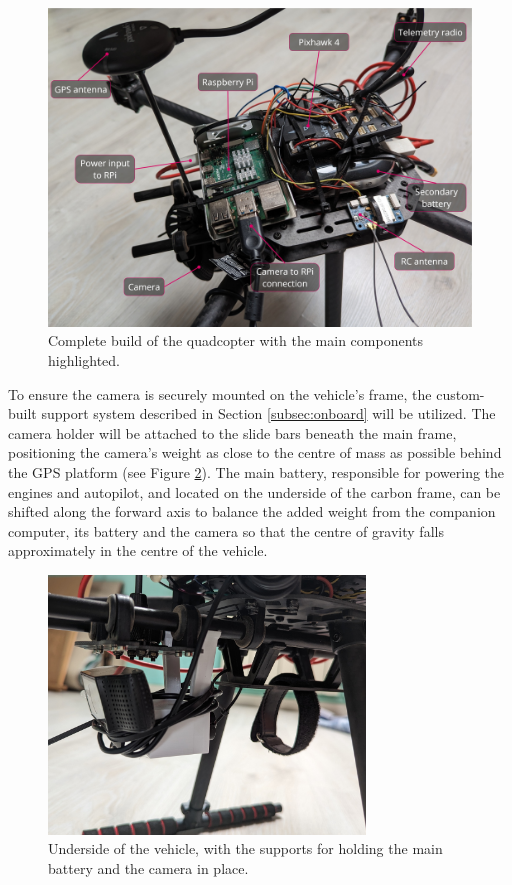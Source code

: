 \begin{figure}[H]
  \centering
  \includegraphics[width=1\textwidth, keepaspectratio]{img/full-build.jpg}
  \caption{Complete build of the quadcopter with the main components highlighted.}\label{fig:full-build}
\end{figure}


To ensure the camera is securely mounted on the vehicle's frame, the custom-built support system described in Section \ref{subsec:onboard} will be utilized. The camera holder will be attached to the slide bars beneath the main frame, positioning the camera's weight as close to the centre of mass as possible behind the GPS platform (see Figure \ref{fig:camera-holder-closeup}). The main battery, responsible for powering the engines and autopilot, and located on the underside of the carbon frame, can be shifted along the forward axis to balance the added weight from the companion computer, its battery and the camera so that the centre of gravity falls approximately in the centre of the vehicle.

\begin{figure}[H]
  \centering
  \includegraphics[width=0.75\textwidth, keepaspectratio]{img/underside-2.jpg}
  \caption{Underside of the vehicle, with the supports for holding the main battery and the camera in place.}
  \label{fig:camera-holder-closeup}
\end{figure}


